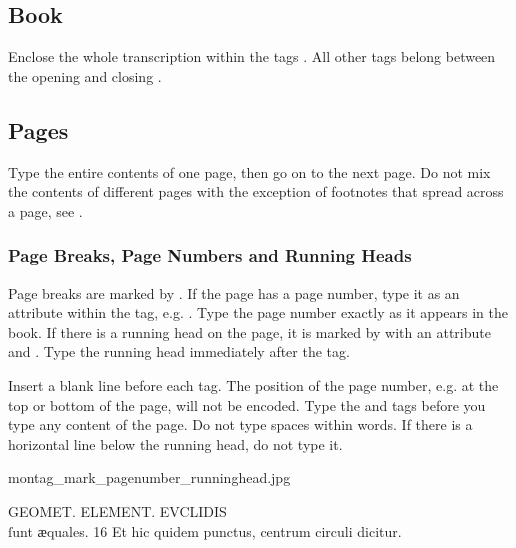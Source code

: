 \tocspace
\subsection{Book}
\label{booklevel}
\begin{mainrule}
Enclose the whole transcription within the tags . All other tags belong between the opening  and closing .
\end{mainrule}


\subsection{Pages}

\begin{mainrule}
Type the entire contents of one page, then go on to the next page. Do not mix the contents of different pages with the exception of footnotes that spread across a page, see .
\end{mainrule}

\subsubsection{Page Breaks, Page Numbers and Running Heads}
\label{section page breaks}

\begin{mainrule}
Page breaks are marked by . If the page has a page number, type it as an attribute  within the  tag, e.g. . Type the page number exactly as it appears in the book. If there is a running head on the page, it is marked by  with an attribute  and . Type the running head immediately after the  tag.
\end{mainrule}

\begin{clarification}
Insert a blank line before each  tag.
The position of the page number, e.g. at the top or bottom of the page, will not be encoded. Type the  and  tags before you type any content of the page. Do not type spaces within words. If there is a horizontal line below the running head, do not type it.
\end{clarification}

\begin{sampleImage}{montag_mark_pagenumber_runninghead.jpg}

\begin{typeLatin}
GEOMET. ELEMENT. EVCLIDIS \\
ſunt ӕquales. 16 Et hic quidem punctus, centrum circuli dicitur. \\
\untranscribedText
\end{typeLatin}
\end{sampleImage}


